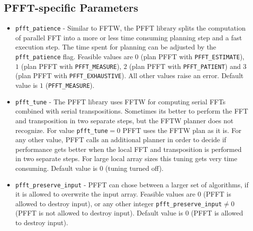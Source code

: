 \subsection{PFFT-specific Parameters}
\begin{itemize}
  \item \verb!pfft_patience! -
    Similar to FFTW, the PFFT library splits the computation of parallel FFT into a more or less time consuming planning step and a fast execution step.
    The time spent for planning can be adjusted by the \verb!pfft_patience! flag. Feasible values are $0$ (plan PFFT with \verb!PFFT_ESTIMATE!), $1$ (plan PFFT with \verb!PFFT_MEASURE!),
    $2$ (plan PFFT with \verb!PFFT_PATIENT!) and $3$ (plan PFFT with \verb!PFFT_EXHAUSTIVE!). All other values raise an error. Default value is $1$ (\verb!PFFT_MEASURE!).
  \item \verb!pfft_tune! -
    The PFFT library uses FFTW for computing serial FFTs combined with serial transpositions. Sometimes its better to perform the FFT and transposition in two separate steps,
    but the FFTW planner does not recognize. For value \verb!pfft_tune!$=0$ PFFT uses the FFTW plan as it is. For any other value, PFFT calls an additional planner in order to decide
    if performance gets better when the local FFT and transposition is performed in two separate steps. For large local array sizes this tuning gets very time consuming.
    Default value is $0$ (tuning turned off).
  \item \verb!pfft_preserve_input! -
    PFFT can chose between a larger set of algorithms, if it is allowed to overwrite the input array.
    Feasible values are $0$ (PFFT is allowed to destroy input), or any other integer \verb!pfft_preserve_input!$\ne0$ (PFFT is not allowed to destroy input).
    Default value is $0$ (PFFT is allowed to destroy input).
\end{itemize}


